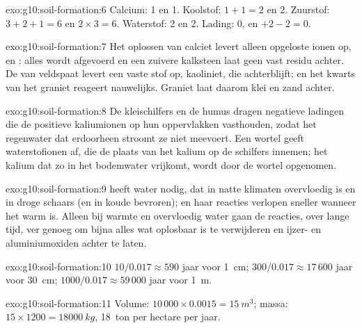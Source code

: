 \begin{solution}{exo:g10:soil-formation:6}
Calcium: 1 en 1. Koolstof: $1 + 1 = 2$ en 2. Zuurstof: $3 + 2 + 1 = 6$ en
$2 \times 3 = 6$. Waterstof: 2 en 2. Lading: 0, en $+2 - 2 = 0$.
\end{solution}

\begin{solution}{exo:g10:soil-formation:7}
Het oplossen van calciet levert alleen opgeloste ionen op,  en
: alles wordt afgevoerd en een zuivere kalksteen laat geen vast residu
achter. De  van veldspaat levert een vaste stof op, kaoliniet, die
achterblijft; en het kwarts van het graniet reageert nauwelijks. Graniet laat
daarom klei en zand achter.
\end{solution}

\begin{solution}{exo:g10:soil-formation:8}
De kleischilfers en de humus dragen negatieve ladingen die de positieve
kaliumionen  op hun oppervlakken vasthouden, zodat het regenwater dat
erdoorheen stroomt ze niet meevoert. Een wortel geeft waterstofionen af, die de
plaats van het kalium op de schilfers innemen; het kalium dat zo in het
bodemwater vrijkomt, wordt door de wortel opgenomen.
\end{solution}

\begin{solution}{exo:g10:soil-formation:9}
 heeft water nodig, dat in natte klimaten overvloedig is en in
droge schaars (en in koude bevroren); en haar reacties verlopen sneller wanneer
het warm is. Alleen bij warmte en overvloedig water gaan de reacties, over lange
tijd, ver genoeg om bijna alles wat oplosbaar is te verwijderen en ijzer- en
aluminiumoxiden achter te laten.
\end{solution}

\begin{solution}{exo:g10:soil-formation:10}
$10/0.017 \approx 590$ jaar voor \qty{1}{cm}; $300/0.017 \approx 17\,600$
jaar voor \qty{30}{cm}; $1000/0.017 \approx 59\,000$ jaar voor \qty{1}{m}.
\end{solution}

\begin{solution}{exo:g10:soil-formation:11}
Volume: $10\,000 \times 0.0015 = \qty{15}{m^3}$; massa: $15 \times 1200 =
\qty{18000}{kg}$, \num{18}~ton per hectare per jaar.
\end{solution}

